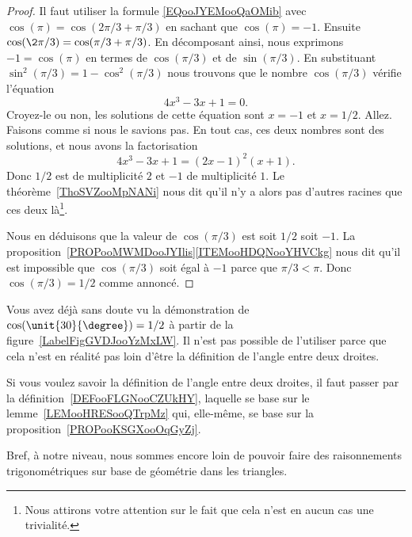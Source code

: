 \begin{proof}
    Il faut utiliser la formule \eqref{EQooJYEMooQaOMib} avec \( \cos(\pi)=\cos(2\pi/3+\pi/3)\) en sachant que \( \cos(\pi)=-1\). Ensuite \( \cos(\2\pi/3)=\cos(\pi/3+\pi/3)\). En décomposant ainsi, nous exprimons \( -1=\cos(\pi)\) en termes de \( \cos(\pi/3)\) et de \( \sin(\pi/3)\). En substituant \( \sin^2(\pi/3)=1-\cos^2(\pi/3)\) nous trouvons que le nombre \( \cos(\pi/3)\) vérifie l'équation
    \begin{equation}
        4x^3-3x+1=0.
    \end{equation}
    Croyez-le ou non, les solutions de cette équation sont \( x=-1\) et \( x=1/2\). Allez. Faisons comme si nous le savions pas. En tout cas, ces deux nombres sont des solutions, et nous avons la factorisation
    \begin{equation}
        4x^3-3x+1=(2x-1)^2(x+1).
    \end{equation}
    Donc \( 1/2\) est de multiplicité \( 2\) et \( -1\) de multiplicité \( 1\). Le théorème~\ref{ThoSVZooMpNANi} nous dit qu'il n'y a alors pas d'autres racines que ces deux là\footnote{Nous attirons votre attention sur le fait que cela n'est en aucun cas une trivialité.}.

    Nous en déduisons que la valeur de \( \cos(\pi/3)\) est soit \( 1/2\) soit \( -1\). La proposition~\ref{PROPooMWMDooJYIlis}\ref{ITEMooHDQNooYHVCkg} nous dit qu'il est impossible que \( \cos(\pi/3)\) soit égal à \( -1\) parce que \( \pi/3<\pi\). Donc \( \cos(\pi/3)=1/2\) comme annoncé.
\end{proof}

\begin{remark}
    Vous avez déjà sans doute vu la démonstration de \( \cos(\unit{30}{\degree})=1/2\) à partir de la figure~\ref{LabelFigGVDJooYzMxLW}. Il n'est pas possible de l'utiliser parce que cela n'est en réalité pas loin d'être la définition de l'angle entre deux droites.

    Si vous voulez savoir la définition de l'angle entre deux droites, il faut passer par la définition~\ref{DEFooFLGNooCZUkHY}, laquelle se base sur le lemme~\ref{LEMooHRESooQTrpMz} qui, elle-même, se base sur la proposition~\ref{PROPooKSGXooOqGyZj}.

    Bref, à notre niveau, nous sommes encore loin de pouvoir faire des raisonnements trigonométriques sur base de géométrie dans les triangles.
\end{remark}


